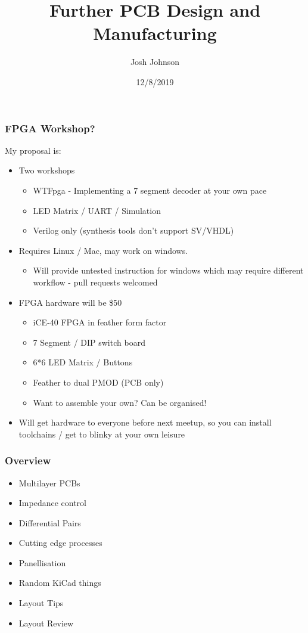 \documentclass[t]{beamer}
\title[furtherPCB]{Further PCB Design and Manufacturing} %
\author{Josh Johnson} %
\institute[] %
{ \\ %
\medskip
\textit{} %
}
\date{12/8/2019} %
\begin{document}
\begin{frame}
\titlepage %
\end{frame}



\begin{frame}
\frametitle{FPGA Workshop?}
My proposal is:
\begin{itemize}
	\item Two workshops
	\begin{itemize}
		\item WTFpga - Implementing a 7 segment decoder at your own pace
		\item LED Matrix / UART / Simulation
		\item Verilog only (synthesis tools don't support SV/VHDL)
	\end{itemize}
	\item Requires Linux / Mac, may work on windows.
	\begin{itemize}
		\item Will provide untested instruction for windows which may require different workflow - pull requests welcomed 
	\end{itemize}
	\item FPGA hardware will be \$50
	\begin{itemize}
		\item iCE-40 FPGA in feather form factor
		\item 7 Segment / DIP switch board
		\item 6*6 LED Matrix / Buttons
		\item Feather to dual PMOD (PCB only)
		\item Want to assemble your own? Can be organised!
	\end{itemize}
	\item Will get hardware to everyone before next meetup, so you can install toolchains / get to blinky at your own leisure 
\end{itemize}
\end{frame}
\begin{frame}
\frametitle{Overview}
\begin{itemize}
	\item Multilayer PCBs
	\item Impedance control
	\item Differential Pairs
	\item Cutting edge processes
	\item Panellisation
	\item Random KiCad things
	\item Layout Tips
	\item Layout Review
\end{itemize}
\end{frame}
\end{document}
